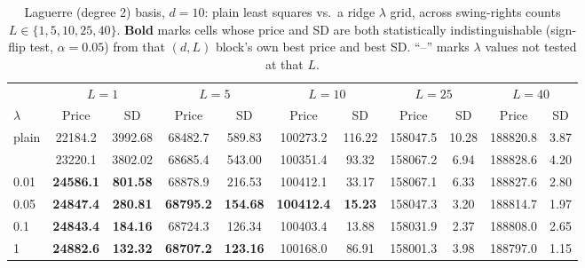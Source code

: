 \begin{table}[htbp]
\caption{\label{tab:laguerre_ridge_lambda_L_sweep_d10}Laguerre (degree 2) basis, $d=10$: plain least squares vs.\ a ridge $\lambda$ grid, across swing-rights counts $L \in \{1,5,10,25,40\}$. \textbf{Bold} marks cells whose price and SD are both statistically indistinguishable (sign-flip test, $\alpha=0.05$) from that $(d,L)$ block's own best price and best SD. ``--'' marks $\lambda$ values not tested at that $L$.}
\scriptsize
\setlength{\tabcolsep}{3pt}
\centering
\begin{tabular}[t]{lcccccccccc}
\toprule
\multicolumn{1}{c}{ } & \multicolumn{2}{c}{$L = 1$} & \multicolumn{2}{c}{$L = 5$} & \multicolumn{2}{c}{$L = 10$} & \multicolumn{2}{c}{$L = 25$} & \multicolumn{2}{c}{$L = 40$} \\
\cmidrule(l{3pt}r{3pt}){2-3} \cmidrule(l{3pt}r{3pt}){4-5} \cmidrule(l{3pt}r{3pt}){6-7} \cmidrule(l{3pt}r{3pt}){8-9} \cmidrule(l{3pt}r{3pt}){10-11}
$\lambda$ & Price & SD & Price & SD & Price & SD & Price & SD & Price & SD\\
\midrule
plain & 22184.2 & 3992.68 & 68482.7 & 589.83 & 100273.2 & 116.22 & 158047.5 & 10.28 & 188820.8 & 3.87\\
\addlinespace
0.001 & 23220.1 & 3802.02 & 68685.4 & 543.00 & 100351.4 & 93.32 & 158067.2 & 6.94 & 188828.6 & 4.20\\
0.01 & \textbf{24586.1} & \textbf{801.58} & 68878.9 & 216.53 & 100412.1 & 33.17 & 158067.1 & 6.33 & 188827.6 & 2.80\\
0.05 & \textbf{24847.4} & \textbf{280.81} & \textbf{68795.2} & \textbf{154.68} & \textbf{100412.4} & \textbf{15.23} & 158047.3 & 3.20 & 188814.7 & 1.97\\
0.1 & \textbf{24843.4} & \textbf{184.16} & 68724.3 & 126.34 & 100403.4 & 13.88 & 158031.9 & 2.37 & 188808.0 & 2.65\\
1 & \textbf{24882.6} & \textbf{132.32} & \textbf{68707.2} & \textbf{123.16} & 100168.0 & 86.91 & 158001.3 & 3.98 & 188797.0 & 1.15\\
\bottomrule
\end{tabular}
\end{table}

